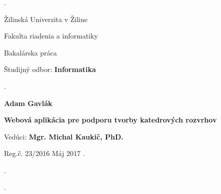 \begin{titlepage}
\phantom.

\bigskip

\begin{center}
{\sc\LARGE Žilinská Univerzita v Žiline}
\medskip

{\sc\Large Fakulta riadenia a informatiky}

\vfill\vfill\vfill\vfill

{\sc\LARGE Bakalárska práca}

\medskip

{\large Študijný odbor: {\bf Informatika}}
\end{center}


\vfill\vfill\vfill\vfill


\phantom.\hfill
\begin{minipage}{10cm}
\begin{center}
{\large\bf Adam Gavlák}

\medskip

{\large\bf Webová aplikácia pre podporu tvorby katedrových rozvrhov}

\medskip

Vedúci: {\bf Mgr. Michal Kaukič, PhD.}

\medskip
 
\hfill
Reg.č. 23/2016 
\hfill
Máj 2017
\hfill\phantom.
\end{center}
\end{minipage}
\hspace{1.7cm}\phantom.

\vspace{2.9cm}

\phantom.
\end{titlepage}



\begin{abstract}

\noindent
{\sc Gavlák Adam:} {\em Webová aplikácia pre podporu tvorby katedrových rozvrhov}
[Bakalárska práca] 

\noindent
Žilinská Univerzita v~Žiline,  
Fakulta riadenia a informatiky,  
Katedra matematických metód a operačnej analýzy.

\noindent  
Vedúci: Mgr. Michal Kaukič, PhD.

\noindent
FRI ŽU v~Žiline, 2017 --- ? s.

\bigskip

Obsahom práce je analýza, návrh a implementácia webovej aplikácie pre podporu tvorby katedrových rozvrhov s využitím moderných webových technológii, ktorá umožní urýchlenie a automatizáciu niektorých interných procesov Katedry matematických metód.


\end{abstract}


